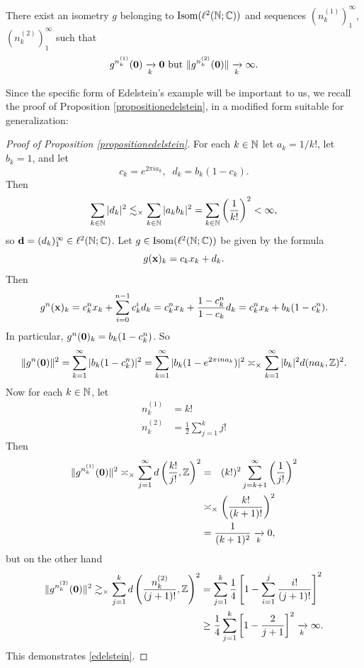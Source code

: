 \begin{proposition}
\label{propositionedelstein}
There exist an isometry $g$ belonging to $\Isom(\ell^2(\N;\C))$ and sequences $(n_k^{(1)})_1^\infty$, $(n_k^{(2)})_1^\infty$ such that
\begin{equation}
\label{edelstein}
g^{n_k^{(1)}}(\mathbf 0) \xrightarrow[k]{} \mathbf 0 \textup{ but } \|g^{n_k^{(2)}}(\mathbf 0)\| \xrightarrow[k]{} \infty.
\end{equation}
\end{proposition}
Since the specific form of Edelstein's example will be important to us, we recall the proof of Proposition \ref{propositionedelstein}, in a modified form suitable for generalization:
\begin{proof}[Proof of Proposition \ref{propositionedelstein}]
For each $k\in\N$ let $a_k = 1/k!$, let $b_k = 1$, and let
\begin{equation}
\label{edelsteindef1}
c_k = e^{2\pi i a_k}, \;\; d_k = b_k (1 - c_k).
\end{equation}
Then
\[
\sum_{k\in\N}|d_k|^2 \lesssim_\times \sum_{k\in\N}|a_k b_k|^2 = \sum_{k\in\N} \left(\frac{1}{k!}\right)^2 < \infty,
\]
so $\dd = (d_k)_1^\infty\in\ell^2(\N;\C)$. Let $g\in\Isom(\ell^2(\N;\C))$ be given by the formula
\begin{equation}
\label{edelsteindef2}
g(\mathbf x)_k = c_k x_k + d_k.
\end{equation}
Then
\begin{equation}
\label{homomorphism}
g^n(\mathbf x)_k = c_k^n x_k + \sum_{i = 0}^{n - 1} c_k^i d_k = c_k^n x_k + \frac{1 - c_k^n}{1 - c_k} d_k = c_k^n x_k + b_k(1 - c_k^n).
\end{equation}
In particular, $g^n(\mathbf 0)_k = b_k(1 - c_k^n)$. So
\begin{equation}
\label{gn0norm}
\|g^n(\0)\|^2 = \sum_{k = 1}^\infty |b_k(1 - c_k^n)|^2
= \sum_{k = 1}^\infty |b_k(1 - e^{2\pi i na_k})|^2
\asymp_\times \sum_{k = 1}^\infty |b_k|^2\dist(n a_k,\Z)^2.
\end{equation}
Now for each $k\in\N$, let
\begin{align*}
n_k^{(1)} &= k! \\
n_k^{(2)} &= \frac12\sum_{j = 1}^k j!
\end{align*}
Then
\begin{align*}
\|g^{n_k^{(1)}}(\0)\|^2 \asymp_\times \sum_{j = 1}^\infty \dist\left(\frac{k!}{j!},\Z\right)^2
&=_\pt (k!)^2\sum_{j = k + 1}^\infty \left(\frac{1}{j!}\right)^2\\
&\asymp_\times \left(\frac{k!}{(k+1)!}\right)^2\\ 
&= \frac{1}{(k + 1)^2} \tendsto k 0,
\end{align*}
but on the other hand
\begin{align*}
\|g^{n_k^{(2)}}(\0)\|^2 \gtrsim_\times \sum_{j = 1}^k \dist\left(\frac{n_k^{(2)}}{(j + 1)!},\Z\right)^2
&= \sum_{j = 1}^k \frac 14\left[1 - \sum_{i = 1}^j \frac{i!}{(j + 1)!}\right]^2\\
&\geq \frac 14 \sum_{j = 1}^k \left[1 - \frac{2}{j + 1}\right]^2 \tendsto k \infty.
\end{align*}
This demonstrates \eqref{edelstein}.
\end{proof}
